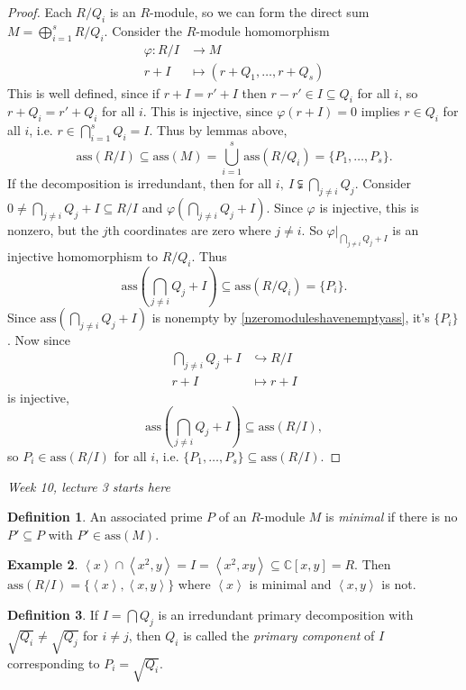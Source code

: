 \documentclass[a4paper]{article}
\newcommand{\la}{\left\langle}
\newcommand{\ra}{\right\rangle}
\newcommand{\C}{\mathbb C}
\newcommand{\ass}{\text{ass}}
\theoremstyle{definition}
\newtheorem{defn}{Definition}[subsection]
\newtheorem{example}[defn]{Example}
\begin{document}
\begin{proof}
Each $R/Q_i$ is an $R$-module, so we can form the direct sum $M=\bigoplus_{i=1}^s R/Q_i$. Consider the $R$-module homomorphism
\[
\begin{aligned}
\varphi:R/I&\rightarrow M\\
r+I&\mapsto (r+Q_1,\ldots,r+Q_s)
\end{aligned}
\]
This is well defined, since if $r+I=r'+I$ then $r-r'\in I\subseteq Q_i$ for all $i$, so $r+Q_i=r'+Q_i$ for all $i$. This is injective, since $\varphi(r+I)=0$ implies $r\in Q_i$ for all $i$, i.e. $r\in\bigcap_{i=1}^s Q_i=I$. Thus by lemmas above,
\[
\ass(R/I)\subseteq\ass(M)=\bigcup_{i=1}^s \ass (R/Q_i)=\{P_1,\ldots,P_s\}.
\]
If the decomposition is irredundant, then for all $i,\ I\subsetneqq \bigcap_{j\neq i}Q_j$. Consider $0\neq \bigcap_{j\neq i} Q_j+I\subseteq R/I$ and $\varphi\left(\bigcap_{j\neq i} Q_j+I\right)$. Since $\varphi$ is injective, this is nonzero, but the $j$th coordinates are zero where $j\neq i$. So $\varphi|_{\bigcap_{j\neq i} Q_j+I}$ is an injective homomorphism to $R/Q_i$. Thus
\[
\ass\left(\bigcap_{j\neq i} Q_j+I\right)\subseteq \ass (R/Q_i)=\{P_i\}.
\]
Since $\ass\left(\bigcap_{j\neq i} Q_j+I\right)$ is nonempty by \ref{nzeromoduleshavenemptyass}, it's $\{P_i\}$. Now since
\[
\begin{aligned}
\bigcap_{j\neq i} Q_j+I&\hookrightarrow R/I\\
r+I&\mapsto r+I
\end{aligned}
\]
is injective,
\[
\ass\left(\bigcap_{j\neq i} Q_j+I\right)\subseteq \ass(R/I),
\]
so $P_i\in\ass(R/I)$ for all $i$, i.e. $\{P_1,\ldots,P_s\}\subseteq \ass(R/I)$.
\end{proof}

\begin{flushright}
\textit{Week 10, lecture 3 starts here}
\end{flushright}

\begin{defn}
An associated prime $P$ of an $R$-module $M$ is \textit{minimal} if there is no $P'\subseteq P$ with $P'\in\ass(M)$.
\end{defn}
\begin{example}
$\la x\ra\cap \la x^2,y\ra =I=\la x^2,xy\ra \subseteq \C[x,y]=R$. Then $\ass(R/I)=\{\la x\ra,\la x,y\ra\}$ where $\la x\ra$ is minimal and $\la x,y\ra$ is not.
\end{example}

\begin{defn}
If $I=\bigcap Q_j$ is an irredundant primary decomposition with $\sqrt{Q_i}\neq \sqrt{Q_j}$ for $i\neq j$, then $Q_i$ is called the \textit{primary component} of $I$ corresponding to $P_i=\sqrt{Q_i}$.
\end{defn}
\end{document}
